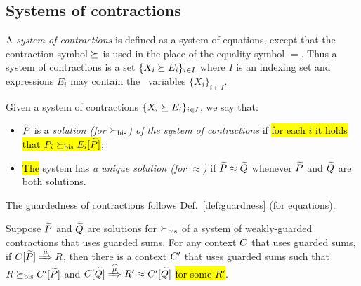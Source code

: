 \subsection{Systems of contractions}
\label{ss:SysContr}

A \emph{system of contractions} is defined as a system of equations,
except that the contraction symbol $\mathrel{\succeq}$ is used in the place of
the equality symbol $=$. Thus a system of contractions is a set 
$\{  X_i \mathrel{\succeq} E_i\}_{i\in I}$
where $I$ is an  indexing set and expressions
$E_i$  may contain the  \behavC\  variables 
$\{  X_i\}_{i\in I}$.

\begin{definition}
\label{d:uniContra}
Given a system of contractions 
$\{  X_i \mathrel{\succeq} E_i\}_{i\in I}$, 
 we say that:
\begin{itemize}
\item $\widetilde P$ is a \emph{solution (for $\mathrel{\succeq_{\rm{bis}}}$) of the 
 system of contractions} if \hl{for each $i$ it holds that $P_i \mathrel{\succeq_{\rm{bis}}} E_i [\widetilde P]$};
\item \hl{The} system has \emph{a unique solution (for $\approx$)}
if $\widetilde P \approx \widetilde Q$ whenever $\widetilde P$ and $\widetilde Q$ are both solutions.
\end{itemize}
\end{definition}

The guardedness of contractions follows Def.~\ref{def:guardness} (for equations).


\begin{lemma}
\label{l:uptocon}
Suppose $\widetilde P$ and $\widetilde Q$ are solutions  for $\mathrel{\succeq_{\rm{bis}}}$
 of a system of weakly-guarded contractions that uses 
guarded sums.
For any context $C$  that uses 
guarded sums,
if  $\ct{\til P}\Arr{\mu}  R$, then there is a context $C'$  that uses 
guarded sums
such that $R \mathrel{\succeq_{\rm{bis}}} C' [\widetilde P]$ and $\ct{\til Q} \Arcap{\mu} R'
 \wb \ctp{\til Q}$ \hl{for some $R'$}.
\end{lemma}

